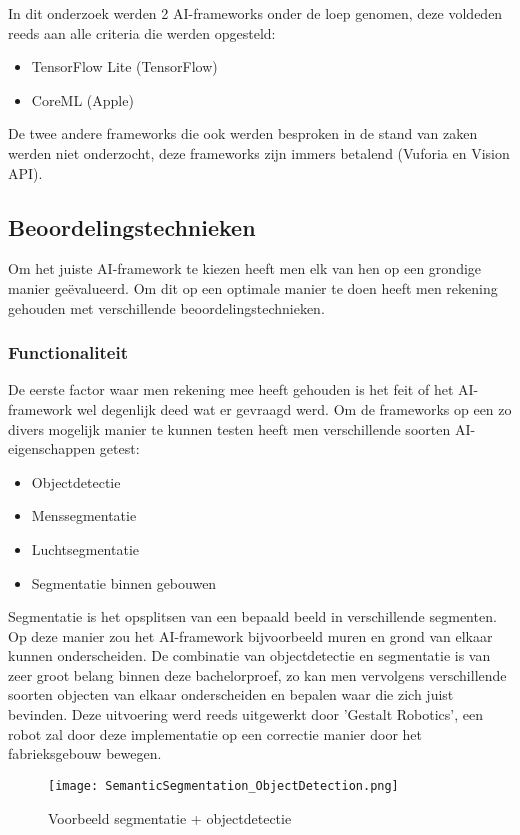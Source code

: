 In dit onderzoek werden 2 AI-frameworks onder de loep genomen, deze voldeden reeds aan alle criteria die werden opgesteld:

\begin{itemize}
	\item TensorFlow Lite (TensorFlow)
	\item CoreML (Apple)
\end{itemize}

De twee andere frameworks die ook werden besproken in de stand van zaken werden niet onderzocht, deze frameworks zijn immers betalend (Vuforia en Vision API). 

\subsection{Beoordelingstechnieken}
Om het juiste AI-framework te kiezen heeft men elk van hen op een grondige manier geëvalueerd. Om dit op een optimale manier te doen heeft men rekening gehouden met verschillende beoordelingstechnieken.

\subsubsection{Functionaliteit}
De eerste factor waar men rekening mee heeft gehouden is het feit of het AI-framework wel degenlijk deed wat er gevraagd werd. Om de frameworks op een zo divers mogelijk manier te kunnen testen heeft men verschillende soorten AI-eigenschappen getest:
\begin{itemize}
	\item Objectdetectie
	\item Menssegmentatie
	\item Luchtsegmentatie 
	\item Segmentatie binnen gebouwen
\end{itemize}
Segmentatie is het opsplitsen van een bepaald beeld in verschillende segmenten. Op deze manier zou het AI-framework bijvoorbeeld muren en grond van elkaar kunnen onderscheiden. De combinatie van objectdetectie en segmentatie is van zeer groot belang binnen deze bachelorproef, zo kan men vervolgens verschillende soorten objecten van elkaar onderscheiden en bepalen waar die zich juist bevinden. Deze uitvoering werd reeds uitgewerkt door 'Gestalt Robotics', een robot zal door deze implementatie op een correctie manier door het fabrieksgebouw bewegen.

\begin{figure}[H]
	\centering
	\texttt{[image: SemanticSegmentation\_ObjectDetection.png]}
	\caption{Voorbeeld segmentatie + objectdetectie \autocite{Gestalt2019}}
\end{figure}

